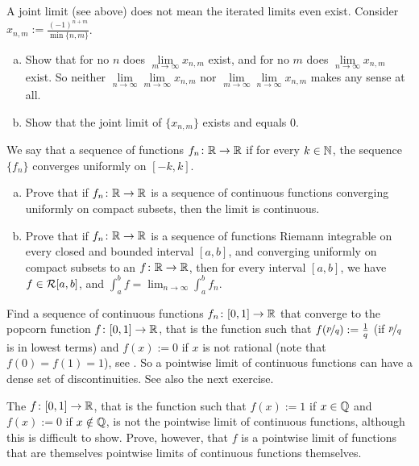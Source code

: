 \begin{exercise}
A joint limit (see above) does not mean the iterated limits even exist.
Consider $x_{n,m} := \frac{{(-1)}^{n+m}}{\min \{n,m \}}$.
\begin{enumerate}[a)]
\item
Show that for no $n$ does
$\lim\limits_{m \to \infty} x_{n,m}$ exist, and for no $m$
does 
$\lim\limits_{n \to \infty} x_{n,m}$ exist.  So neither
$\lim\limits_{n\to\infty}\lim\limits_{m \to \infty} x_{n,m}$ nor
$\lim\limits_{m\to\infty}\lim\limits_{n \to \infty} x_{n,m}$ makes any sense
at all.
\item
Show that the joint limit of $\{ x_{n,m} \}$ exists and equals 0.
\end{enumerate}
\end{exercise}

\begin{exercise}
We say that a sequence of functions $f_n \colon {\mathbb{R}} \to {\mathbb{R}}$
\emph{}
if for every $k \in {\mathbb{N}}$,
the sequence $\{ f_n \}$ converges uniformly on $[-k,k]$.
\begin{enumerate}[a)]
\item
Prove that if $f_n \colon {\mathbb{R}} \to {\mathbb{R}}$ is a sequence of
continuous functions converging uniformly on compact subsets, then
the limit is continuous.
\item 
Prove that if $f_n \colon {\mathbb{R}} \to {\mathbb{R}}$ is a sequence of
functions Riemann integrable on every closed and bounded interval $[a,b]$,
and converging uniformly on compact subsets to an $f \colon {\mathbb{R}} \to {\mathbb{R}}$,
then for every interval $[a,b]$, we have $f \in {\mathcal{R}}[a,b]$, and
$\int_a^b f = \lim_{n\to\infty} \int_a^b f_n$.
\end{enumerate}
\end{exercise}

\begin{exercise}[Challenging]
Find a sequence of continuous functions $f_n \colon [0,1] \to {\mathbb{R}}$ that
converge to the popcorn function $f \colon [0,1] \to {\mathbb{R}}$, that is the
function such that $f(\nicefrac{p}{q}) := \frac{1}{q}$ (if $\nicefrac{p}{q}$
is in lowest terms) and $f(x) := 0$ if $x$ is not rational (note
that $f(0) = f(1) = 1$),
see .
So a pointwise limit of continuous functions can have a dense set of
discontinuities.  See also the next exercise.
\end{exercise}

\begin{exercise}[Challenging]
The 
$f \colon [0,1] \to {\mathbb{R}}$, that is the
function such that $f(x) := 1$ if $x \in {\mathbb{Q}}$
and $f(x) := 0$ if $x \notin {\mathbb{Q}}$,
is not the pointwise limit of
continuous functions, although this is difficult to show.
Prove, however, that $f$ is a pointwise limit of functions that are themselves
pointwise limits of
continuous functions themselves.
\end{exercise}

